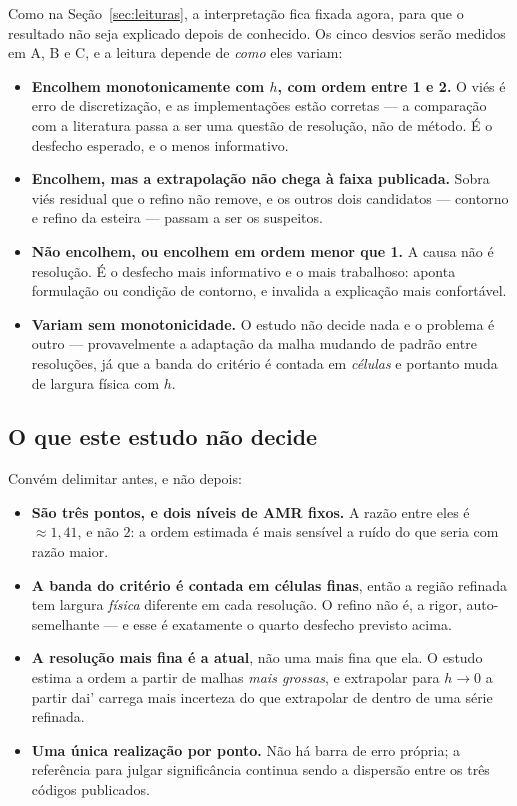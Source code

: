 Como na Se\c{c}\~ao~\ref{sec:leituras}, a interpreta\c{c}\~ao fica fixada agora,
para que o resultado n\~ao seja explicado depois de conhecido. Os cinco desvios
ser\~ao medidos em A, B e C, e a leitura depende de \emph{como} eles variam:

\begin{itemize}
  \item \textbf{Encolhem monotonicamente com $h$, com ordem entre 1 e 2.} O vi\'es
    \'e erro de discretiza\c{c}\~ao, e as implementa\c{c}\~oes est\~ao corretas ---
    a compara\c{c}\~ao com a literatura passa a ser uma quest\~ao de
    resolu\c{c}\~ao, n\~ao de m\'etodo. \'E o desfecho esperado, e o menos
    informativo.
  \item \textbf{Encolhem, mas a extrapola\c{c}\~ao n\~ao chega \`a faixa
    publicada.} Sobra vi\'es residual que o refino n\~ao remove, e os outros dois
    candidatos --- contorno e refino da esteira --- passam a ser os suspeitos.
  \item \textbf{N\~ao encolhem, ou encolhem em ordem menor que 1.} A causa n\~ao \'e
    resolu\c{c}\~ao. \'E o desfecho mais informativo e o mais trabalhoso: aponta
    formula\c{c}\~ao ou condi\c{c}\~ao de contorno, e invalida a explica\c{c}\~ao
    mais confort\'avel.
  \item \textbf{Variam sem monotonicidade.} O estudo n\~ao decide nada e o
    problema \'e outro --- provavelmente a adapta\c{c}\~ao da malha mudando de
    padr\~ao entre resolu\c{c}\~oes, j\'a que a banda do crit\'erio \'e contada em
    \emph{c\'elulas} e portanto muda de largura f\'isica com $h$.
\end{itemize}

\subsection{O que este estudo n\~ao decide}

Convém delimitar antes, e n\~ao depois:

\begin{itemize}
  \item \textbf{S\~ao tr\^es pontos, e dois n\'iveis de AMR fixos.} A raz\~ao
    entre eles \'e $\approx 1{,}41$, e n\~ao $2$: a ordem estimada \'e mais
    sens\'ivel a ru\'ido do que seria com raz\~ao maior.
  \item \textbf{A banda do crit\'erio \'e contada em c\'elulas finas}, ent\~ao a
    regi\~ao refinada tem largura \emph{f\'isica} diferente em cada
    resolu\c{c}\~ao. O refino n\~ao \'e, a rigor, auto-semelhante --- e esse \'e
    exatamente o quarto desfecho previsto acima.
  \item \textbf{A resolu\c{c}\~ao mais fina \'e a atual}, n\~ao uma mais fina que
    ela. O estudo estima a ordem a partir de malhas \emph{mais grossas}, e
    extrapolar para $h\to0$ a partir dai' carrega mais incerteza do que
    extrapolar de dentro de uma s\'erie refinada.
  \item \textbf{Uma \'unica realiza\c{c}\~ao por ponto.} N\~ao h\'a barra de erro
    pr\'opria; a refer\^encia para julgar signific\^ancia continua sendo a
    dispers\~ao entre os tr\^es c\'odigos publicados.
\end{itemize}

